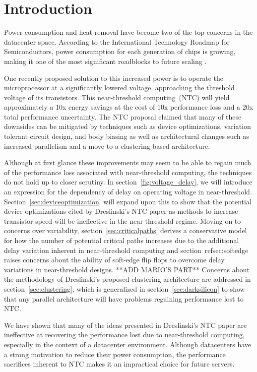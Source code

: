 \section{Introduction}
\label{sec:intro}

Power consumption and heat removal have become two of the top concerns in the datacenter space\cite{EPA_2007}. 
According to the International Technology Roadmap for Semiconductors, power consumption for each generation of chips is growing, making it one of the most significant roadblocks to future scaling \cite{Devised_2009}. 

One recently proposed  solution to this increased power is to operate the microprocessor at a significantly lowered voltage, approaching the threshold voltage of its transistors\cite{Dreslinski:2010ez}. 
This near-threshold computing~(NTC) will yield approximately a 10x energy savings at the cost of 10x performance loss and a 20x total performance uncertainty. 
The NTC proposal claimed that many of these downsides can be mitigated by techniques such as device optimizations, variation tolerant circuit design, and body biasing as well as architectural changes such as increased parallelism and a move to a clustering-based architecture.

Although at first glance these improvements may seem to be able to regain much of the performance loss associated with near-threshold computing, the techniques do not hold up to closer scrutiny. 
In section~\ref{fig:voltage_delay}, we will introduce an expression for the dependency of delay on operating voltage in near-threshold.
Section~\ref{sec:deviceoptimization} will expand upon this to show that the potential device optimizations cited by Dreslinski's NTC paper as methods to increase transistor speed will be ineffective in the near-threshold regime.
Moving on to concerns over variability, section~\ref{sec:criticalpaths} derives a conservative model for how the number of potential critical paths increases due to the additional delay variation inherent in near-threshold computing and section~ref{sec:softedge} raises concerns about the ability of soft-edge flip flops to overcome delay variations in near-threshold designs.
**ADD MARIO'S PART**
Concerns about the methodology of Dreslinski's proposed clustering architecture are addressed in section~\ref{sec:clustering}, which is generalized in section~\ref{sec:darksilicon} to show that any parallel architecture will have problems regaining performance lost to NTC.

We have shown that many of the ideas presented in Dreslinski's NTC paper \cite{Dreslinski:2010ez} are ineffective at recovering the performance lost due to near-threshold computing, especially in the context of a datacenter environment. 
Although datacenters have a strong motivation to reduce their power consumption, the performance sacrifices inherent to NTC makes it an impractical choice for future servers.